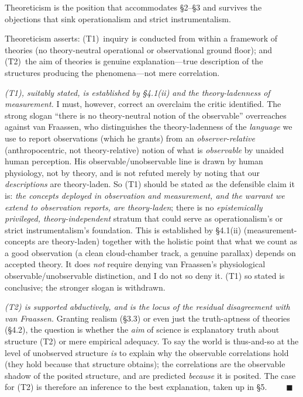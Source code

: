 \documentclass[12pt]{article}
\begin{document}
\begin{description}[leftmargin=1.6em,style=nextline]
\item[Claim 6.] Theoreticism is the position that accommodates \S2--\S3
and survives the objections that sink operationalism and strict
instrumentalism.
\end{description}

Theoreticism asserts: (T1)~inquiry is conducted from within a framework of
theories (no theory-neutral operational or observational ground floor);
and (T2)~the aim of theories is genuine explanation---true description of
the structures producing the phenomena---not mere correlation.

\emph{(T1), suitably stated, is established by \S4.1(ii) and the
theory-ladenness of measurement.} I must, however, correct an overclaim
the critic identified. The strong slogan ``there is no theory-neutral
notion of the observable'' overreaches against van Fraassen, who
distinguishes the theory-ladenness of the \emph{language} we use to report
observations (which he grants) from an \emph{observer-relative}
(anthropocentric, not theory-relative) notion of what is \emph{observable}
by unaided human perception. His observable/unobservable line is drawn by
human physiology, not by theory, and is not refuted merely by noting that
our \emph{descriptions} are theory-laden. So (T1) should be stated as the
defensible claim it is: \emph{the concepts deployed in observation and
measurement, and the warrant we extend to observation reports, are
theory-laden}; there is no \emph{epistemically privileged,
theory-independent} stratum that could serve as operationalism's or
strict instrumentalism's foundation. This is established by \S4.1(ii)
(measurement-concepts are theory-laden) together with the holistic point
that what we count as a good observation (a clean cloud-chamber track, a
genuine parallax) depends on accepted theory. It does \emph{not} require
denying van Fraassen's physiological observable/unobservable distinction,
and I do not so deny it. (T1) so stated is conclusive; the stronger slogan
is withdrawn.

\emph{(T2) is supported abductively, and is the locus of the residual
disagreement with van Fraassen.} Granting realism (\S3.3) or even just
the truth-aptness of theories (\S4.2), the question is whether the
\emph{aim} of science is explanatory truth about structure (T2) or mere
empirical adequacy. To say the world is thus-and-so at the level of
unobserved structure \emph{is} to explain why the observable
correlations hold (they hold because that structure obtains); the
correlations are the observable shadow of the posited structure, and are
predicted \emph{because} it is posited. The case for (T2) is therefore an
inference to the best explanation, taken up in \S5.
$\qquad\blacksquare$
\end{document}
